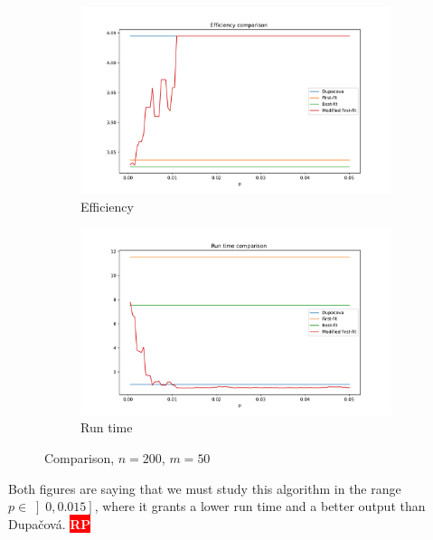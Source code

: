 \documentclass{amsart}
\newcommand{\nb}[3]{
		{\colorbox{#2}{\bfseries\sffamily\tiny\textcolor{white}{#1}}}
		{\textcolor{#2}{\text{$\blacktriangleright$}{\textcolor{#2}{#3}}\text{$\blacktriangleleft$}}}}
\newcommand{\rp}[1]{\nb{RP}{red}{#1}}
\begin{document}
\begin{figure}[ht]
    \centering
    \begin{subfigure}[b]{0.495\textwidth}
        \centering
        \includegraphics[width=1.1\textwidth]{plots/efficiency p.pdf}
        \caption{Efficiency}
    \end{subfigure}
    \hfill
    \begin{subfigure}[b]{0.495\textwidth}
        \centering
        \includegraphics[width=1.1\textwidth]{plots/run time p.pdf}
        \caption{Run time}
    \end{subfigure}
    \caption{Comparison, $n=200$, $m=50$}
    \label{p}
\end{figure}

Both figures are saying that we must study this algorithm in the range $p\in\left]0,0.015\right]$, where it grants a lower run time and a better output than Dupačová.  \rp{là}
\end{document}
